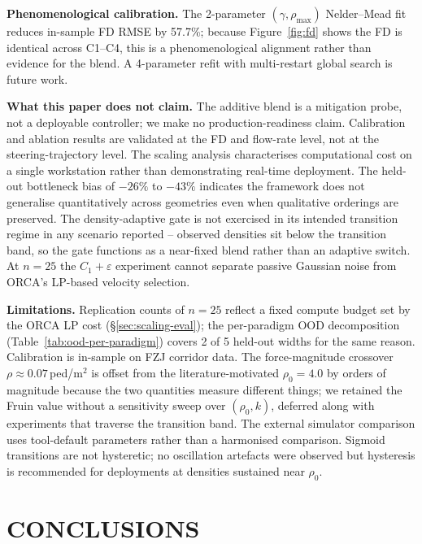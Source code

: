 \documentclass[a4paper,twoside]{article}
\begin{document}
\textbf{Phenomenological calibration.}
The 2-parameter $(\gamma,\rho_{\max})$ Nelder--Mead fit reduces in-sample FD RMSE by 57.7\%; because Figure~\ref{fig:fd} shows the FD is identical across C1--C4, this is a phenomenological alignment rather than evidence for the blend. A 4-parameter refit with multi-restart global search is future work.

\textbf{What this paper does not claim.}
The additive blend is a mitigation probe, not a deployable controller; we make no production-readiness claim. Calibration and ablation results are validated at the FD and flow-rate level, not at the steering-trajectory level. The scaling analysis characterises computational cost on a single workstation rather than demonstrating real-time deployment. The held-out bottleneck bias of $-26\%$ to $-43\%$ indicates the framework does not generalise quantitatively across geometries even when qualitative orderings are preserved. The density-adaptive gate is not exercised in its intended transition regime in any scenario reported -- observed densities sit below the transition band, so the gate functions as a near-fixed blend rather than an adaptive switch. At $n=25$ the $C_1{+}\varepsilon$ experiment cannot separate passive Gaussian noise from ORCA's LP-based velocity selection.

\textbf{Limitations.}
Replication counts of $n=25$ reflect a fixed compute budget set by the ORCA LP cost (\S\ref{sec:scaling-eval}); the per-paradigm OOD decomposition (Table~\ref{tab:ood-per-paradigm}) covers 2 of 5 held-out widths for the same reason. Calibration is in-sample on FZJ corridor data. The force-magnitude crossover $\rho\!\approx\!0.07$\,ped/m$^2$ is offset from the literature-motivated $\rho_0{=}4.0$ by orders of magnitude because the two quantities measure different things; we retained the Fruin value without a sensitivity sweep over $(\rho_0,k)$, deferred along with experiments that traverse the transition band. The external simulator comparison uses tool-default parameters rather than a harmonised comparison. Sigmoid transitions are not hysteretic; no oscillation artefacts were observed but hysteresis is recommended for deployments at densities sustained near $\rho_0$.


\section{\uppercase{Conclusions}}
\label{sec:conclusion}
\end{document}
